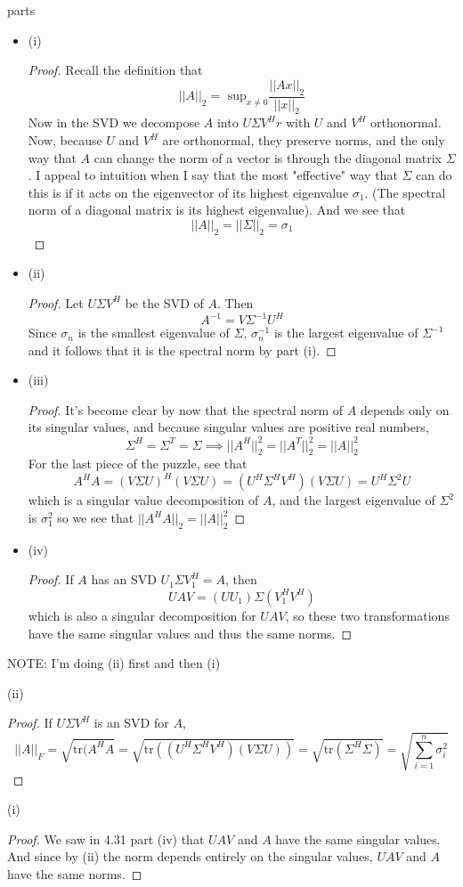\documentclass[12pt]{article}
\newenvironment{problem}[2][Problem]{\begin{trivlist}
\item[\hskip \labelsep {\bfseries #1}\hskip \labelsep {\bfseries #2.}]}{\end{trivlist}}
\theoremstyle{definition}
\theoremstyle{definition}
\theoremstyle{definition}
\theoremstyle{definition}
\begin{document}
\begin{problem}{4.31} 4 parts
\begin{itemize}
\item (i) \begin{proof}
Recall the definition that 
$$||A||_2 = \text{ sup}_{x \neq 0} \frac{||Ax||_2}{||x||_2}$$
Now in the SVD we decompose $A$ into $U\Sigma V^Hr$ with $U$ and $V^H$ orthonormal. Now, because $U$ and $V^H$ are orthonormal, they preserve norms, and the only way that $A$ can change the norm of a vector is through the diagonal matrix $\Sigma$. I appeal to intuition when I say that the most "effective" way that $\Sigma$ can do this is if it acts on the eigenvector of its highest eigenvalue $\sigma_1$. (The spectral norm of a diagonal matrix is its highest eigenvalue). And we see that  $$||A||_2 = ||\Sigma||_2 = \sigma_1$$
\end{proof}  
\item (ii) \begin{proof}
Let $U \Sigma V^H$ be the SVD of $A$. Then 
$$ A^{-1} = V \Sigma^{-1} U^H$$ 
Since $\sigma_n$ is the smallest eigenvalue of $\Sigma$, $\sigma_n^{-1}$ is the largest eigenvalue of $\Sigma^{-1}$ and it follows that it is the spectral norm by part (i).
\end{proof}
\item (iii) \begin{proof}
It's become clear by now that the spectral norm of $A$ depends only on its singular values, and because singular values are positive real numbers, 
$$
\Sigma^H = \Sigma^T = \Sigma \implies ||A^H||_2^2 = ||A^T||_2^2 = ||A||_2^2
$$
For the last piece of the puzzle, see that
$$A^HA = (V \Sigma U)^H(V \Sigma U) = (U^H  \Sigma^H V^H)(V \Sigma U) = U^H \Sigma^2 U$$
which is a singular value decomposition of $A$, and the largest eigenvalue of $\Sigma^2$ is $\sigma_1^2$ so we see that $||A^HA||_2 = ||A||_2^2 $ 
\end{proof}
\item (iv) \begin{proof}
If $A$ has an SVD $U_1 \Sigma V_1^H = A$, then 
$$ UAV = (UU_1) \Sigma (V_1^HV^H) $$
which is also a singular decomposition for $UAV$, so these two transformations have the same singular values and thus the same norms.
\end{proof}
\end{itemize}
\end{problem}

\begin{problem}{4.32} \textbf{NOTE:} I'm doing (ii) first and then (i)
\item (ii)
\begin{proof}
If $U\Sigma V^H$ is an SVD for $A$,
$$ ||A||_F = \sqrt{\text{tr}(A^HA} = \sqrt{\text{tr}((U^H  \Sigma^H V^H)(V \Sigma U))} = \sqrt{\text{tr}(\Sigma^H\Sigma)} = \sqrt{\sum_{i=1}^n \sigma_i^2} $$
\end{proof}
\item (i)
\begin{proof}
We saw in 4.31 part (iv) that $UAV$ and $A$ have the same singular values. And since by (ii) the norm depends entirely on the singular values, $UAV$ and $A$ have the same norms.
\end{proof}
\end{problem}
\end{document}
